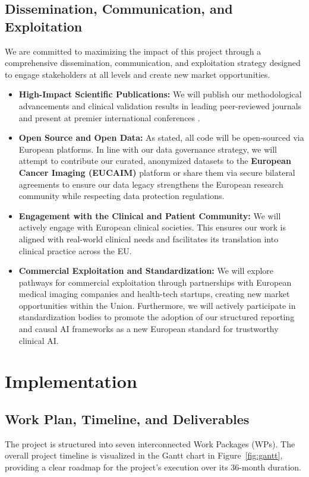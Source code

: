 \documentclass[11pt, a4paper]{article}
\begin{document}
\subsection{Dissemination, Communication, and Exploitation}
We are committed to maximizing the impact of this project through a comprehensive dissemination, communication, and exploitation strategy designed to engage stakeholders at all levels and create new market opportunities.
\begin{itemize}
    \item \textbf{High-Impact Scientific Publications:} We will publish our methodological advancements and clinical validation results in leading peer-reviewed journals and present at premier international conferences .
    \item \textbf{Open Source and Open Data:} As stated, all code will be open-sourced via European platforms. In line with our data governance strategy, we will attempt to contribute our curated, anonymized datasets to the \textbf{European Cancer Imaging (EUCAIM)} platform or share them via secure bilateral agreements to ensure our data legacy strengthens the European research community while respecting data protection regulations.
    \item \textbf{Engagement with the Clinical and Patient Community:} We will actively engage with European clinical societies. This ensures our work is aligned with real-world clinical needs and facilitates its translation into clinical practice across the EU.
    \item \textbf{Commercial Exploitation and Standardization:} We will explore pathways for commercial exploitation through partnerships with European medical imaging companies and health-tech startups, creating new market opportunities within the Union. Furthermore, we will actively participate in standardization bodies to promote the adoption of our structured reporting and causal AI frameworks as a new European standard for trustworthy clinical AI.
\end{itemize}

\section{Implementation}

\subsection{Work Plan, Timeline, and Deliverables}
The project is structured into seven interconnected Work Packages (WPs). The overall project timeline is visualized in the Gantt chart in Figure~\ref{fig:gantt}, providing a clear roadmap for the project's execution over its 36-month duration.
\end{document}
